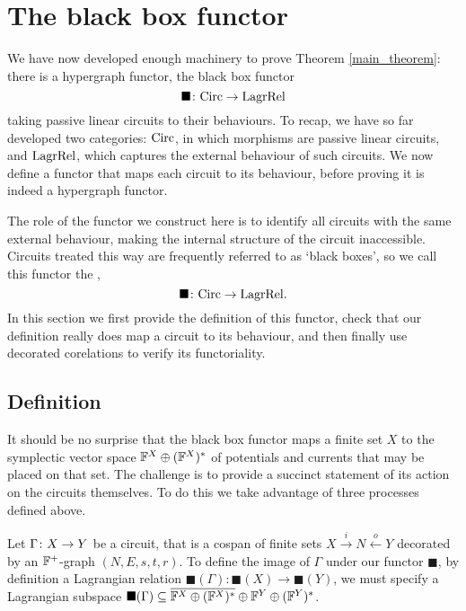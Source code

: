 \section{The black box functor} \label{sec:blackbox}
We have now developed enough machinery to prove Theorem \ref{main_theorem}:
there is a hypergraph functor, the black box functor
\[  
\blacksquare{\colon} \mathrm{Circ} \to \mathrm{LagrRel} 
\]
taking passive linear circuits to their behaviours. To recap, we have so far
developed two categories: $\mathrm{Circ}$, in which morphisms are passive linear
circuits, and $\mathrm{LagrRel}$, which captures the external behaviour of such circuits.
We now define a functor that maps each circuit to its behaviour, before proving
it is indeed a hypergraph functor. 

The role of the functor we construct here is to identify all circuits with the
same external behaviour, making the internal structure of the circuit
inaccessible. Circuits treated this way are frequently referred to as
`black boxes', so we call this functor the ,
\[
\blacksquare{\colon} \mathrm{Circ} \to \mathrm{LagrRel}.
\] 
In this section we first provide the definition of this functor, check
that our definition really does map a circuit to its behaviour, and then finally
use decorated corelations to verify its functoriality.

\subsection{Definition}
It should be no surprise that the black box functor maps a finite set $X$ to the
symplectic vector space ${\mathbb F}^X \oplus ({\mathbb F}^X)^\ast$ of potentials and currents
that may be placed on that set. The challenge is to provide a succinct
statement of its action on the circuits themselves. To do this we take advantage
of three processes defined above.

Let $\Gamma{\colon} X \to Y$ be a circuit, that is a cospan of finite sets $X
\stackrel{i}{\longrightarrow} N \stackrel{o}{\longleftarrow} Y$ decorated by an
${\mathbb F}^+$-graph $(N,E,s,t,r)$. To define the image of $\Gamma$ under our functor
$\blacksquare$, by definition a Lagrangian relation $\blacksquare(\Gamma):
\blacksquare(X) \to \blacksquare(Y)$, we must specify a Lagrangian subspace
$\blacksquare(\Gamma) \subseteq \overline{{\mathbb F}^X \oplus ({\mathbb F}^X)^\ast} \oplus {\mathbb F}^Y
\oplus ({\mathbb F}^Y)^\ast$.  

